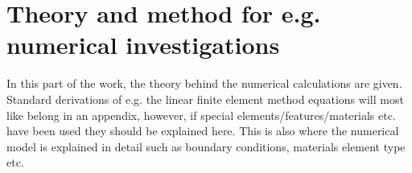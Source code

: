 \chapter{Theory and method for e.g. numerical investigations}
In this part of the work, the theory behind the numerical calculations are given. Standard derivations of e.g. the linear finite element method equations will most like belong in an appendix, however, if special elements/features/materials etc. have been used they should be explained here. This is also where the numerical model is explained in detail such as boundary conditions, materials element type etc. 